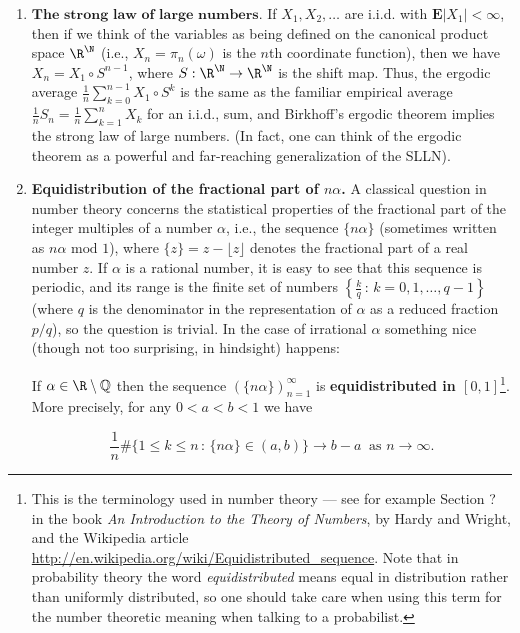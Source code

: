 \begin{enumerate}[label=\arabic*.]
\item $\textbf{The strong law of large numbers.}$ If
$X_1,X_2,\ldots$ are i.i.d. with
$\mathbf{E}|X_1|<\infty$, then if we think of the
variables as being defined on the canonical product
space $\R^\N$ (i.e., $X_n=\pi_n(\omega)$ is the $n$th
coordinate function), then we have
$X_n = X_1\circ S^{n-1}$, where $S:\R^\N\to\R^\N$ is
the shift map. Thus, the ergodic average
$\frac{1}{n} \sum_{k=0}^{n-1} X_1\circ S^k$ is the
same as the familiar empirical average
$\frac{1}{n} S_n = \frac{1}{n} \sum_{k=1}^n X_k$ for
an i.i.d., sum, and Birkhoff's ergodic theorem implies
the strong law of large numbers. (In fact, one can
think of the ergodic theorem as a powerful and
far-reaching generalization of the SLLN).

\item \textbf{Equidistribution of the fractional part of
$n\alpha$.} A classical question in number theory
concerns the statistical properties of the fractional
part of the integer multiples of a number $\alpha$,
i.e., the sequence $\{n \alpha \}$ (sometimes written
as $n\alpha \textrm{ mod }1$), where
$\{z\}=z-\lfloor z\rfloor$ denotes the fractional
part of a real number $z$. If $\alpha$ is a rational
number, it is easy to see that this sequence is
periodic, and its range is the finite set of numbers
$\left\{ \frac{k}{q}\,:\, k=0,1,\ldots,q-1 \right\}$
(where $q$ is the denominator in the representation
of $\alpha$ as a reduced fraction $p/q$), so the
question is trivial. In the case of irrational
$\alpha$ something nice (though not too surprising,
in hindsight) happens:

\begin{thm}
\label{thm-equidistribution}
If $\alpha\in \R\setminus\mathbb{Q}$ then the
sequence $( \{ n\alpha \} )_{n=1}^\infty$ is
\textbf{equidistributed in $[0,1]$}\footnote{This is the terminology used in number theory --- see
for example Section ? in the book \emph{An Introduction to
the Theory of Numbers}, by Hardy and Wright, and the
Wikipedia article
\href{http://en.wikipedia.org/wiki/Equidistributed_sequence}{http://en.wikipedia.org/wiki/Equidistributed\_sequence}.
Note that in probability theory the word
\emph{equidistributed} means equal in distribution rather
than uniformly distributed, so one should take care
when using this term for the number theoretic meaning
when talking to a probabilist.}.
More precisely, for any $0<a<b<1$ we have

\[
\frac{1}{n} \# \Big\{ 1\le k\le n\,:\, \{n\alpha\}\in (a,b) \Big\} \to b-a\ \textrm{ as }n\to\infty.
\]


\end{thm}
\end{enumerate}

